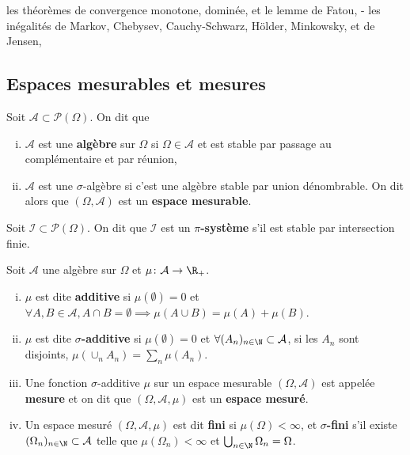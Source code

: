 les théorèmes de convergence monotone, dominée, et le lemme de Fatou,
- les inégalités de Markov, Chebysev, Cauchy-Schwarz, Hölder, Minkowsky, et
de Jensen,
\subsection{Espaces mesurables et mesures}

	\begin{defn}
		Soit $\mathcal{A} \subset \mathcal{P}(\Omega)$.
		On dit que
		\begin{enumerate}[(i)]
			\item $\mathcal{A}$ est une \textbf{algèbre} sur $\Omega$ si $\Omega \in \mathcal{A}$ et est stable par passage au complémentaire et par réunion,
			\item $\mathcal{A}$ est une $\sigma$-algèbre si c'est une algèbre stable par union dénombrable.
				On dit alors que $(\Omega,\mathcal{A})$ est un \textbf{espace mesurable}.
		\end{enumerate}
	\end{defn}

	\begin{defn}
		Soit $\mathcal{I} \subset \mathcal{P}(\Omega)$.
		On dit que $\mathcal{I}$ est un \textbf{$\pi$-système} s'il est stable par intersection finie.
	\end{defn}

	\begin{defn}
		Soit $\mathcal{A}$ une algèbre sur $\Omega$ et $\mu \colon \mathcal{A} \to \R_+$.
		\begin{enumerate}[(i)]
			\item $\mu$ est dite \textbf{additive} si $\mu(\emptyset) = 0$ et $\forall A,B \in \mathcal{A}, A \cap B = \emptyset \implies \mu(A \cup B) = \mu(A) + \mu(B)$.
			\item $\mu$ est dite \textbf{$\sigma$-additive} si $\mu(\emptyset) = 0$ et $\forall (A_n)_{n \in \N} \subset \mathcal{A}$, si les $A_n$ sont disjoints, $\mu(\cup_n A_n) = \sum_n \mu(A_n)$.
			\item Une fonction $\sigma$-additive $\mu$ sur un espace mesurable $(\Omega,\mathcal{A})$ est appelée \textbf{mesure} et on dit que $(\Omega,\mathcal{A},\mu)$ est un \textbf{espace mesuré}.
			\item Un espace mesuré $(\Omega,\mathcal{A},\mu)$ est dit \textbf{fini} si $\mu(\Omega) < \infty$, et \textbf{$\sigma$-fini} s'il existe $(\Omega_n)_{n \in \N} \subset \mathcal{A}$ telle que $\mu(\Omega_n) < \infty$ et $\bigcup_{n \in \N} \Omega_n = \Omega$.
		\end{enumerate}
	\end{defn}

